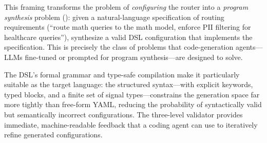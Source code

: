 This framing transforms the problem of \emph{configuring} the router into a \emph{program synthesis} problem (): given a natural-language specification of routing requirements (``route math queries to the math model, enforce PII filtering for healthcare queries''), synthesize a valid DSL configuration that implements the specification.
This is precisely the class of problems that code-generation agents---LLMs fine-tuned or prompted for program synthesis---are designed to solve.

The DSL's formal grammar and type-safe compilation make it particularly suitable as the target language: the structured syntax---with explicit keywords, typed blocks, and a finite set of signal types---constrains the generation space far more tightly than free-form YAML, reducing the probability of syntactically valid but semantically incorrect configurations.
The three-level validator provides immediate, machine-readable feedback that a coding agent can use to iteratively refine generated configurations.

